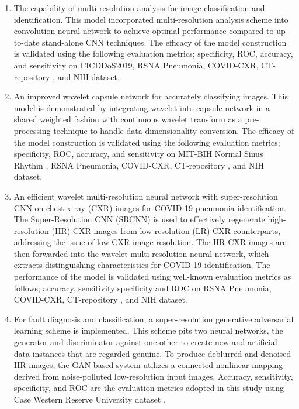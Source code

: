 \documentclass{standalone}
\begin{document}
\begin{enumerate}
    \item The capability of multi-resolution analysis for image classification and identification. This model incorporated multi-resolution analysis scheme into convolution neural network to achieve optimal performance compared to up-to-date stand-alone CNN techniques. The efficacy of the model construction is validated using  the following evaluation metrics; specificity,  ROC,  accuracy, and sensitivity on CICDDoS2019, RSNA Pneumonia,  COVID-CXR, CT-repository , and NIH dataset.
    
    
    \item An improved wavelet capsule network for accurately classifying images. This model is demonstrated by integrating wavelet into capsule network in a shared weighted fashion with continuous wavelet transform as a pre-processing technique to handle data dimensionality conversion. The efficacy of the model construction is validated using  the following evaluation metrics; specificity,  ROC,  accuracy, and sensitivity on MIT-BIH Normal Sinus Rhythm , RSNA Pneumonia, COVID-CXR, CT-repository , and NIH dataset.
    
    
    \item  An efficient wavelet multi-resolution neural network with super-resolution CNN on chest x-ray (CXR) images for COVID-19 pneumonia identification. The Super-Resolution CNN (SRCNN) is used to effectively regenerate high-resolution (HR) CXR images from low-resolution (LR) CXR counterparts, addressing the issue of low CXR image resolution. The HR CXR images are then forwarded into the wavelet multi-resolution neural network, which extracts distinguishing characteristics for COVID-19 identification. The performance of the model is validated using well-known evaluation metrics as follows; accuracy, sensitivity specificity and ROC on RSNA Pneumonia, COVID-CXR, CT-repository , and NIH dataset.
    
    
    \item For fault diagnosis and classification, a super-resolution generative adversarial learning scheme is implemented. This scheme pits two neural networks, the generator and discriminator against one other to create new and artificial data instances that are regarded genuine. To produce deblurred and denoised HR images, the GAN-based system utilizes a connected nonlinear mapping derived from noise-polluted low-resolution input images. Accuracy, sensitivity, specificity, and ROC are the evaluation metrics adopted in this study using Case Western Reserve University dataset .
    
    
\end{enumerate}
\end{document}
